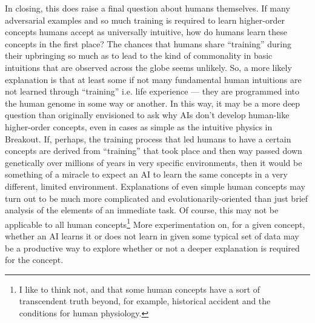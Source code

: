 \documentclass{article}
\begin{document}
In closing, this does raise a final question about humans themselves.
If many adversarial examples and so much training is required to learn higher-order concepts humans accept as universally intuitive, how do humans learn these concepts in the first place?
The chances that humans share ``training'' during their upbringing so much as to lead to the kind of commonality in basic intuitions that are observed across the globe seems unlikely.
So, a more likely explanation is that at least some if not many fundamental human intuitions are not learned through ``training'' i.e. life experience --- they are programmed into the human genome in some way or another.
In this way, it may be a more deep question than originally envisioned to ask why AIs don't develop human-like higher-order concepts, even in cases as simple as the intuitive physics in Breakout.
If, perhaps, the training process that led humans to have a certain concepts are derived from ``training'' that took place and then way passed down genetically over millions of years in very specific environments, then it would be something of a miracle to expect an AI to learn the same concepts in a very different, limited environment. Explanations of even simple human concepts may turn out to be much more complicated and evolutionarily-oriented than just brief analysis of the elements of an immediate task. Of course, this may not be applicable to all human concepts\footnote{I like to think not, and that some human concepts have a sort of transcendent truth beyond, for example, historical accident and the conditions for human physiology.}
More experimentation on, for a given concept, whether an AI learns it or does not learn in given some typical set of data may be a productive way to explore whether or not a deeper explanation is required for the concept.
\end{document}
